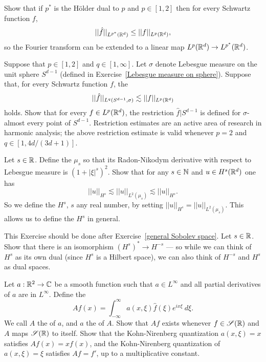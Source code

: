 \begin{exercise}
Show that if $p^{*}$ is the H\"older dual to $p$ and $p \in [1, 2]$ then for every Schwartz function $f$,
\[||\hat{f}||_{L^{p^{*}}(\mathbb{R}^{d})} \leq ||f||_{L^{p}(\mathbb{R}^{d})},\]
so the Fourier transform can be extended to a linear map $L^{p}(\mathbb{R}^{d}) \to L^{p^{*}}(\mathbb{R}^{d})$.
\end{exercise}

\begin{exercise}
Suppose that $p \in [1, 2]$ and $q \in [1, \infty]$.
Let $\sigma$ denote Lebesgue measure on the unit sphere $S^{d-1}$ (defined in Exercise~\ref{Lebesgue measure on sphere}).
Suppose that, for every Schwartz function $f$, the 
\[||\hat{f}||_{L^{q}(S^{d-1}, \sigma)} \lesssim ||f||_{L^{p}(\mathbb{R}^{d})}\]
holds.
Show that for every $f \in L^{p}(\mathbb{R}^{d})$, the restriction $\hat{f}|S^{d-1}$ is defined for $\sigma$-almost every point of $S^{d-1}$.
Restriction estimates are an active area of research in harmonic analysis; the above restriction estimate is valid whenever $p = 2$ and $q \in [1, 4d/(3d+1)]$.
\end{exercise}

\begin{exercise}\label{general Sobolev space}
Let $s \in \mathbb{R}$. Define the  $\mu_{s}$ so that its Radon-Nikodym derivative with respect to Lebesgue measure is ${(1 + |\xi|^{s})}^{2}$.
Show that for any $s \in \mathbb{N}$ and $u \in H^{s}(\mathbb{R}^{d})$ one has
\[||u||_{H^{s}} \lesssim ||u||_{L^{2}(\mu_{s})} \lesssim ||u||_{H^{s}}.\]
So we define the  $H^{s}$, $s$ any real number, by setting $||u||_{H^{s}} = ||u||_{L^{2}(\mu_{s})}$.
This allows us to define the  $H^{s}$ in general.
\end{exercise}

\begin{exercise}
This Exercise should be done after Exercise~\ref{general Sobolev space}.
Let $s \in \mathbb{R}$. Show that there is an isomorphism ${(H^{s})}^{*} \to H^{-s}$ --- so while we can think of $H^{s}$ as its own dual (since $H^{s}$ is a Hilbert space), we can also think of $H^{-s}$ and $H^{s}$ as dual spaces.
\end{exercise}

\begin{exercise}
Let $a: \mathbb{R}^{2} \to \mathbb{C}$ be a smooth function such that $a \in L^{\infty}$ and all partial derivatives of $a$ are in $L^{\infty}$.
Define the 
\[Af(x) = \int_{-\infty}^{\infty} a(x, \xi) \hat{f}(\xi) e^{ix\xi}~d\xi.\]
We call $A$ the  of $a$, and $a$ the  of $A$.
Show that $Af$ exists whenever $f \in \mathscr{S}(\mathbb{R})$ and $A$ maps $\mathscr{S}(\mathbb{R})$ to itself.
Show that the Kohn-Nirenberg quantization $a(x, \xi) = x$ satisfies $Af(x) = xf(x)$, and the Kohn-Nirenberg quantization of $a(x, \xi) = \xi$ satisfies $Af = f'$, up to a multiplicative constant.
\end{exercise}


